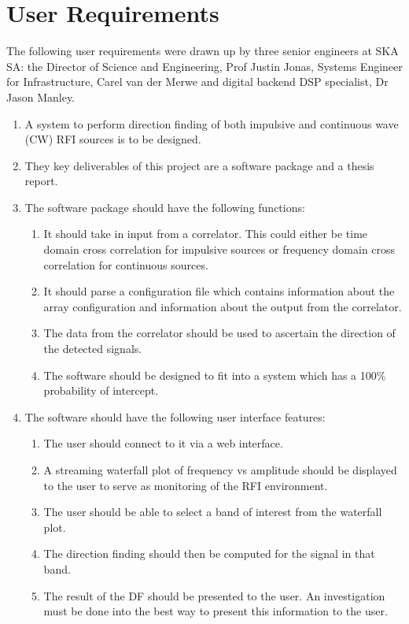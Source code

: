 \section{User Requirements}

The following user requirements were drawn up by three senior engineers at SKA SA: the Director of Science and Engineering, Prof Justin Jonas, Systems Engineer for Infrastructure, Carel van der Merwe and digital backend DSP specialist, Dr Jason Manley. 

\begin{enumerate}
  \item A system to perform direction finding of both impulsive and continuous wave (CW) RFI sources is to be designed.
  \item They key deliverables of this project are a software package and a thesis report.
  \item The software package should have the following functions:
    \begin{enumerate}
      \item It should take in input from a correlator. This could either be time domain cross correlation for impulsive sources or frequency domain cross correlation for continuous sources. 
      \item It should parse a configuration file which contains information about the array configuration and information about the output from the correlator.
      \item The data from the correlator should be used to ascertain the direction of the detected signals.
      \item The software should be designed to fit into a system which has a 100\% probability of intercept. 
    \end{enumerate}
  \item The software should have the following user interface features:
    \begin{enumerate}
      \item The user should connect to it via a web interface.
      \item A streaming waterfall plot of frequency vs amplitude should be displayed to the user to serve as monitoring of the RFI environment.
      \item The user should be able to select a band of interest from the waterfall plot.
      \item The direction finding should then be computed for the signal in that band.
      \item The result of the DF should be presented to the user. An investigation must be done into the best way to present this information to the user.

\end{enumerate}
\end{enumerate}
